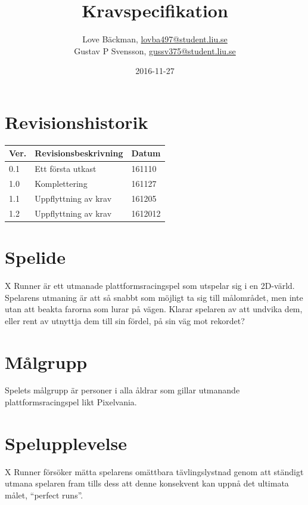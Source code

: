 \documentclass{TDP003mall}
\author{Love Bäckman, \url{lovba497@student.liu.se} \\
  Gustav P Svensson, \url{gussv375@student.liu.se}}
\title{Kravspecifikation}
\date{2016-11-27}
\begin{document}
\projectpage

\tableofcontents
\newpage

\section{Revisionshistorik}
\begin{table}[!h]
\begin{tabularx}{\linewidth}{|l|X|l|}
\hline
Ver. & Revisionsbeskrivning & Datum \\\hline
0.1 & Ett första utkast & 161110 \\\hline
1.0 & Komplettering & 161127 \\\hline
1.1 & Uppflyttning av krav & 161205 \\\hline
1.2 & Uppflyttning av krav & 1612012 \\\hline
\end{tabularx}
\end{table}


\section{Spelide}
X Runner är ett utmanade plattformsracingspel som utspelar sig i en 2D-värld.
Spelarens utmaning är att så snabbt som möjligt ta sig till målområdet, men inte utan att beakta farorna som lurar på vägen. Klarar spelaren av att undvika dem, eller rent av utnyttja dem till sin fördel, på sin väg mot rekordet?

\section{Målgrupp}
Spelets målgrupp är personer i alla åldrar som gillar utmanande plattformsracingspel likt Pixelvania.

\section{Spelupplevelse}
X Runner försöker mätta spelarens omättbara tävlingslystnad genom att ständigt utmana spelaren fram tills dess att denne konsekvent kan uppnå det ultimata målet, ``perfect runs''.
\end{document}
